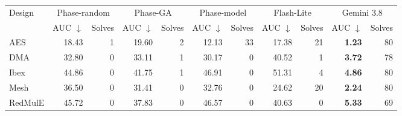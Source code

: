 \begin{tabular}{l*{5}{rr}}
\toprule
Design & \multicolumn{2}{c}{Phase-random} & \multicolumn{2}{c}{Phase-GA} & \multicolumn{2}{c}{Phase-model} & \multicolumn{2}{c}{Flash-Lite} & \multicolumn{2}{c}{Gemini 3.8} \\
 & AUC $\downarrow$ & Solves & AUC $\downarrow$ & Solves & AUC $\downarrow$ & Solves & AUC $\downarrow$ & Solves & AUC $\downarrow$ & Solves \\
\midrule
AES & 18.43 & 1 & 19.60 & 2 & 12.13 & 33 & 17.38 & 21 & \textbf{1.23} & 80 \\
DMA & 32.80 & 0 & 33.11 & 1 & 30.17 & 0 & 40.52 & 1 & \textbf{3.72} & 78 \\
Ibex & 44.86 & 0 & 41.75 & 1 & 46.91 & 0 & 51.31 & 4 & \textbf{4.86} & 80 \\
Mesh & 36.50 & 0 & 31.41 & 0 & 32.76 & 0 & 24.62 & 20 & \textbf{2.24} & 80 \\
RedMulE & 45.72 & 0 & 37.83 & 0 & 46.57 & 0 & 40.63 & 0 & \textbf{5.33} & 69 \\
\bottomrule
\end{tabular}
